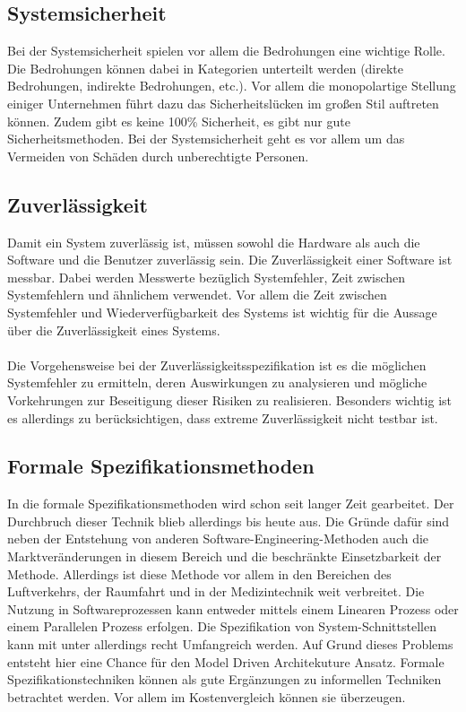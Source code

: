 \subsection{Systemsicherheit}
Bei der Systemsicherheit spielen vor allem die Bedrohungen eine wichtige Rolle. Die Bedrohungen können dabei in Kategorien unterteilt werden (direkte Bedrohungen, indirekte Bedrohungen, etc.). Vor allem die monopolartige Stellung einiger Unternehmen führt dazu das Sicherheitslücken im großen Stil auftreten können. Zudem gibt es keine 100\% Sicherheit, es gibt nur gute Sicherheitsmethoden. Bei der Systemsicherheit geht es vor allem um das Vermeiden von Schäden durch unberechtigte Personen. 

\subsection{Zuverlässigkeit}
Damit ein System zuverlässig ist, müssen sowohl die Hardware als auch die Software und die Benutzer zuverlässig sein. Die Zuverlässigkeit einer Software ist messbar. Dabei werden Messwerte bezüglich Systemfehler, Zeit zwischen Systemfehlern und ähnlichem verwendet. Vor allem die Zeit zwischen Systemfehler und Wiederverfügbarkeit des Systems ist wichtig für die Aussage über die Zuverlässigkeit eines Systems.
\\\\
Die Vorgehensweise bei der Zuverlässigkeitsspezifikation  ist es die möglichen Systemfehler zu ermitteln, deren Auswirkungen zu analysieren und mögliche Vorkehrungen zur Beseitigung dieser Risiken zu realisieren. Besonders wichtig ist es allerdings zu berücksichtigen, dass extreme Zuverlässigkeit nicht testbar ist.

\subsection{Formale Spezifikationsmethoden}
In die formale Spezifikationsmethoden wird schon seit langer Zeit gearbeitet. Der Durchbruch dieser Technik blieb allerdings bis heute aus. Die Gründe dafür sind neben der Entstehung von anderen Software-Engineering-Methoden auch die Marktveränderungen in diesem Bereich und die beschränkte Einsetzbarkeit der Methode. Allerdings ist diese Methode vor allem in den Bereichen des Luftverkehrs, der Raumfahrt und in der Medizintechnik weit verbreitet. Die Nutzung in Softwareprozessen kann entweder mittels einem Linearen Prozess oder einem Parallelen Prozess erfolgen. Die Spezifikation von System-Schnittstellen kann mit unter allerdings recht Umfangreich werden. Auf Grund dieses Problems entsteht hier eine Chance für den Model Driven Architekuture Ansatz.
\linebreak
Formale Spezifikationstechniken können als gute Ergänzungen zu informellen Techniken betrachtet werden. Vor allem im Kostenvergleich können sie überzeugen. 